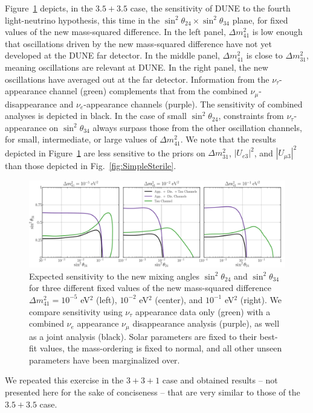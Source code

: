 \documentclass[aps,prd,onecolumn,nofootinbib,superscriptaddress, 11pt]{revtex4}
\begin{document}
Figure~\ref{fig:24_34} depicts, in the $3.5+3.5$ case, the sensitivity of DUNE to the fourth light-neutrino hypothesis, this time in the $\sin^2\theta_{24}\times \sin^2\theta_{34}$ plane, for fixed values of the new mass-squared difference. In the left panel, $\Delta m^2_{41}$ is low enough that oscillations driven by the new mass-squared difference have not yet developed at the DUNE far detector. In the middle panel, $\Delta m_{41}^2$ is close to $\Delta m_{31}^2$, meaning oscillations are relevant at DUNE. In the right panel, the new oscillations have averaged out at the far detector. Information from the $\nu_{\tau}$-appearance channel (green) complements that from the combined $\nu_{\mu}$-disappearance and $\nu_e$-appearance channels (purple). The sensitivity of combined analyses is depicted in black. In the case of small $\sin^2\theta_{24}$, constraints from $\nu_{\tau}$-appearance on $\sin^2\theta_{34}$ always surpass those from the other oscillation channels, for small, intermediate, or large values of $\Delta m^2_{41}$. We note that the results depicted in Figure~\ref{fig:24_34} are less sensitive to the priors on $\Delta m^2_{31}$, $|U_{e3}|^2$, and $|U_{\mu3}|^2$ than those depicted in Fig.~\ref{fig:SimpleSterile}.
\begin{figure}[ht]
\centerline
{\includegraphics[width=1\textwidth]{Fixed_Dm41.pdf}}
\caption{Expected sensitivity to the new mixing angles $\sin^2\theta_{24}$ and $\sin^2\theta_{34}$ for three different fixed values of the new mass-squared difference $\Delta m_{41}^2 = 10^{-5}$ eV$^2$ (left), $10^{-2}$ eV$^2$ (center), and $10^{-1}$ eV$^2$ (right). We compare sensitivity using $\nu_\tau$ appearance data only (green) with a combined $\nu_e$ appearance $\nu_\mu$ disappearance analysis (purple), as well as a joint analysis (black). Solar parameters are fixed to their best-fit values, the mass-ordering is fixed to normal, and all other unseen parameters have been marginalized over.}
\label{fig:24_34}
\end{figure}

We repeated this exercise in the $3+3+1$ case and obtained results -- not presented here for the sake of conciseness -- that are very similar to those of the $3.5+3.5$ case. 
\end{document}
